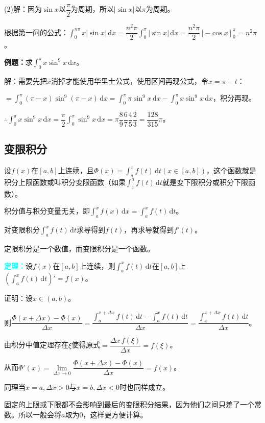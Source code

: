 \documentclass[UTF8, 12pt]{ctexart}
\begin{document}
(2)解：因为$\sin x$以$\dfrac{\pi}{2}$为周期，所以$\vert\sin x\vert$以$\pi$为周期。

根据第一问的公式：$\int_0^{n\pi}x\vert\sin x\vert\,\textrm{d}x=\dfrac{n^2\pi}{2}\int_0^\pi\vert\sin x\vert\,\textrm{d}x=\dfrac{n^2\pi}{2}[-\cos x]_0^\pi=n^2\pi$。

\textbf{例题：}求$\int_0^\pi x\sin^9x\,\textrm{d}x$。

解：需要先把$x$消掉才能使用华里士公式，使用区间再现公式，令$x=\pi-t$：

$=\int_0^\pi(\pi-x)\sin^9(\pi-x)\,\textrm{d}x=\int_0^\pi\pi\sin^9x\,\textrm{d}x-\int_0^\pi x\sin^9x\,\textrm{d}x$，积分再现。

$\therefore\int_0^\pi x\sin^9x\,\textrm{d}x=\dfrac{\pi}{2}\int_0^\pi\sin^9x\,\textrm{d}x=\pi\dfrac{8}{9}\dfrac{6}{7}\dfrac{4}{5}\dfrac{2}{3}=\dfrac{128}{315}\pi$。

\subsection{变限积分}

设$f(x)$在$[a,b]$上连续，且$\Phi(x)=\int_a^xf(t)\,\textrm{d}t(x\in[a,b])$，这个函数就是积分上限函数或叫积分变限函数（如果$\int_x^af(t)\,\textrm{d}t$就是变下限积分或积分下限函数）。

积分值与积分变量无关，即$\int_a^xf(x)\,\textrm{d}x=\int_a^xf(t)\,\textrm{d}t$。

对变限积分$\int_{a}^xf(t)\,\textrm{d}t$求导得到$f(t)$，再求导就得到$f'(t)$。

定限积分是一个数值，而变限积分是一个函数。

\textcolor{aqua}{\textbf{定理：}}设$f(x)$在$[a,b]$上连续，则$\int_a^xf(t)\,\textrm{d}t$在$[a,b]$上$(\int_a^xf(t)\,\textrm{d}t)'=f(x)$。

证明：设$x\in(a,b)$。

则$\dfrac{\Phi(x+\Delta x)-\Phi(x)}{\Delta x}=\dfrac{\int_a^{x+\Delta x}f(t)\,\textrm{d}t-\int_a^xf(t)\,\textrm{d}t}{\Delta x}=\dfrac{\int_x^{x+\Delta x}f(t)\,\textrm{d}t}{\Delta x}$。

由积分中值定理存在$\xi$使得原式$=\dfrac{\Delta x\,f(\xi)}{\Delta x}=f(\xi)$。

从而$\Phi'(x)=\lim\limits_{\Delta x\to 0}\dfrac{\Phi(x+\Delta x)-\Phi(x)}{\Delta x}=f(x)$。

同理当$x=a,\Delta x>0$与$x=b,\Delta x<0$时也同样成立。

固定的上限或下限都不会影响到最后的变限积分结果，因为他们之间只差了一个常数。所以一般会将$a$取为0，这样更方便计算。
\end{document}
